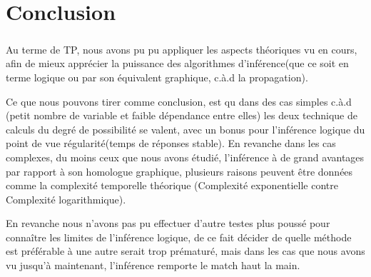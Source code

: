 \documentclass[]{report}
\begin{document}
	\chapter{Conclusion}
	\paragraph{}
	Au terme de TP, nous avons pu pu appliquer les aspects théoriques vu en cours, afin de mieux apprécier la puissance des
	algorithmes d'inférence(que ce soit en terme logique ou par son équivalent graphique, c.à.d la propagation).
	\par 
	Ce que nous pouvons tirer comme conclusion, est qu dans des cas simples c.à.d (petit nombre de variable et faible dépendance
	entre elles) les deux technique de calculs du degré de possibilité se valent, avec un bonus pour l'inférence logique du point
	de vue régularité(temps de réponses stable). En revanche dans les cas complexes, du moins ceux que nous avons étudié, l'inférence
	à de grand avantages par rapport à son homologue graphique, plusieurs raisons peuvent être données comme la complexité 
	temporelle théorique (Complexité exponentielle contre Complexité logarithmique).
	\par 
	En revanche nous n'avons pas pu effectuer d'autre testes plus poussé pour connaître les limites de l'inférence logique, de ce 
	fait décider de quelle méthode est préférable à une autre serait trop prématuré, mais dans les cas que nous avons vu jusqu'à 
	maintenant, l'inférence remporte le match haut la main.
\end{document}
